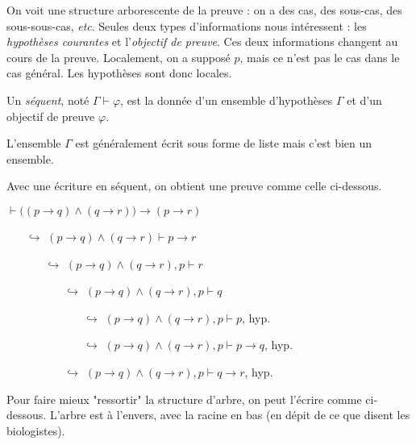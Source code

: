 \documentclass{../notes}
\begin{document}
  On voit une structure arborescente de la preuve : on a des cas, des sous-cas, des sous-sous-cas, \textit{etc}.
  Seules deux types d'informations nous intéressent : les \textit{hypothèses courantes} et l'\textit{objectif de preuve}.
  Ces deux informations changent au cours de la preuve.
  Localement, on a supposé $p$, mais ce n'est pas le cas dans le cas général. Les hypothèses sont donc locales.

  \begin{defn}
    Un \textit{séquent}, noté $\Gamma \vdash \varphi$, est la donnée d'un ensemble d'hypothèses $\Gamma$ et d'un objectif de preuve $\varphi$.

    L'ensemble $\Gamma$ est généralement écrit sous forme de liste mais c'est bien un ensemble.
  \end{defn}

  Avec une écriture en séquent, on obtient une preuve comme celle ci-dessous.

  \begin{exm}
    $\vdash \big((p \to q) \land (q \to r)\big) \to (p \to r)$
    \begin{itemize}
      \item[$\hookrightarrow$] $(p\to q) \land (q \to r) \vdash p \to r$
        \begin{itemize}
          \item[$\hookrightarrow$] $(p\to q) \land (q \to r), p \vdash r$
            \begin{itemize}
              \item[$\hookrightarrow$] $(p\to q) \land (q \to r), p \vdash q$
                \begin{itemize}
                  \item[$\hookrightarrow$] $(p\to q) \land (q \to r), p \vdash p$, hyp.
                  \item[$\hookrightarrow$] $(p\to q) \land (q \to r), p \vdash p \to q$, hyp.
                \end{itemize}
              \item[$\hookrightarrow$] $(p\to q) \land (q \to r), p \vdash q\to r$, hyp.
            \end{itemize}
        \end{itemize}
    \end{itemize}
  \end{exm}

  Pour faire mieux "ressortir" la structure d'arbre, on peut l'écrire comme ci-dessous.
  L'arbre est à l'envers, avec la racine en bas (en dépit de ce que disent les biologistes).
\end{document}
